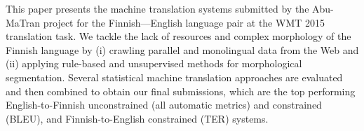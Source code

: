 This paper presents the machine translation systems submitted by the Abu-MaTran project for the Finnish---English language pair at the WMT 2015 translation task. We tackle the lack of resources and complex morphology of the Finnish language by (i) crawling parallel and monolingual data from the Web and (ii) applying rule-based and unsupervised methods for morphological segmentation. Several statistical machine translation approaches are evaluated and then combined to obtain our final submissions, which are the top performing English-to-Finnish unconstrained (all automatic metrics) and constrained (BLEU), and Finnish-to-English constrained (TER) systems.
